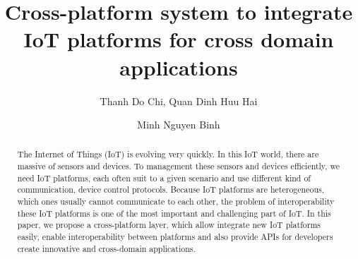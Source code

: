\documentclass[runningheads,a4paper]{llncs}
\newcommand{\keywords}[1]{\par\addvspace\baselineskip
\noindent\keywordname\enspace\ignorespaces#1}
\begin{document}
\mainmatter  %

\title{Cross-platform system to integrate IoT platforms for cross domain applications}


%
%
\author{Thanh Do Chi, Quan Dinh Huu Hai \and Minh Nguyen Binh}
%


%
%

\maketitle


\begin{abstract}
The Internet of Things (IoT) is evolving very quickly. In this IoT world, there are massive of sensors and devices. To management these sensors and devices efficiently, we need IoT platforms, each often suit to a given scenario and use different kind of communication, device control protocols. Because IoT platforms are heterogeneous, which ones usually cannot communicate to each other, the problem of interoperability these IoT platforms is one of the most important and challenging part of IoT. In this paper, we propose a cross-platform layer, which allow integrate new IoT platforms easily, enable interoperability between platforms and also provide APIs for developers create innovative and cross-domain applications.




\end{abstract}
\end{document}
